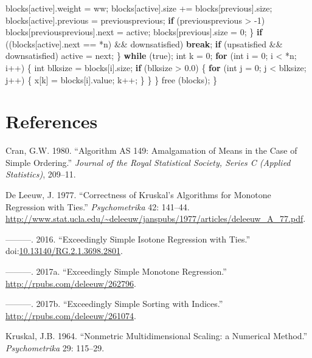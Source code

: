 \documentclass[12pt,]{article}
\newenvironment{Shaded}{\begin{snugshade}}{\end{snugshade}}
\newcommand{\KeywordTok}[1]{\textcolor[rgb]{0.13,0.29,0.53}{\textbf{{#1}}}}
\newcommand{\DataTypeTok}[1]{\textcolor[rgb]{0.13,0.29,0.53}{{#1}}}
\newcommand{\DecValTok}[1]{\textcolor[rgb]{0.00,0.00,0.81}{{#1}}}
\newcommand{\FloatTok}[1]{\textcolor[rgb]{0.00,0.00,0.81}{{#1}}}
\newcommand{\NormalTok}[1]{{#1}}
\begin{document}
\begin{Shaded}
\begin{Highlighting}[]
            \NormalTok{blocks[active].weight = ww;}
            \NormalTok{blocks[active].size += blocks[previous].size;}
            \NormalTok{blocks[active].previous = previousprevious;}
            \KeywordTok{if} \NormalTok{(previousprevious > -}\DecValTok{1}\NormalTok{)}
                \NormalTok{blocks[previousprevious].next = active;}
            \NormalTok{blocks[previous].size = }\DecValTok{0}\NormalTok{;}
        \NormalTok{\}}
        \KeywordTok{if} \NormalTok{((blocks[active].next == *n) && downsatisfied) }\KeywordTok{break}\NormalTok{;}
        \KeywordTok{if} \NormalTok{(upsatisfied && downsatisfied) active = next;}
    \NormalTok{\} }\KeywordTok{while} \NormalTok{(true);}
    \DataTypeTok{int} \NormalTok{k = }\DecValTok{0}\NormalTok{;}
    \KeywordTok{for} \NormalTok{(}\DataTypeTok{int} \NormalTok{i = }\DecValTok{0}\NormalTok{; i < *n; i++) \{}
        \DataTypeTok{int} \NormalTok{blksize = blocks[i].size;}
        \KeywordTok{if} \NormalTok{(blksize > }\FloatTok{0.0}\NormalTok{) \{}
            \KeywordTok{for} \NormalTok{(}\DataTypeTok{int} \NormalTok{j = }\DecValTok{0}\NormalTok{; j < blksize; j++) \{}
                \NormalTok{x[k] = blocks[i].value;}
                \NormalTok{k++;}
            \NormalTok{\}}
        \NormalTok{\}}
    \NormalTok{\}}
    \NormalTok{free (blocks);}
\NormalTok{\}}
\end{Highlighting}
\end{Shaded}

\section*{References}\label{references}

\hypertarget{refs}{}
\hypertarget{ref-cran_80}{}
Cran, G.W. 1980. ``Algorithm AS 149: Amalgamation of Means in the Case
of Simple Ordering.'' \emph{Journal of the Royal Statistical Society,
Series C (Applied Statistics)}, 209--11.

\hypertarget{ref-deleeuw_A_77}{}
De Leeuw, J. 1977. ``Correctness of Kruskal's Algorithms for Monotone
Regression with Ties.'' \emph{Psychometrika} 42: 141--44.
\url{http://www.stat.ucla.edu/~deleeuw/janspubs/1977/articles/deleeuw_A_77.pdf}.

\hypertarget{ref-deleeuw_E_16d}{}
---------. 2016. ``Exceedingly Simple Isotone Regression with Ties.''
doi:\href{https://doi.org/10.13140/RG.2.1.3698.2801}{10.13140/RG.2.1.3698.2801}.

\hypertarget{ref-deleeuw_E_17g}{}
---------. 2017a. ``Exceedingly Simple Monotone Regression.''
\url{http://rpubs.com/deleeuw/262796}.

\hypertarget{ref-deleeuw_E_17f}{}
---------. 2017b. ``Exceedingly Simple Sorting with Indices.''
\url{http://rpubs.com/deleeuw/261074}.

\hypertarget{ref-kruskal_64b}{}
Kruskal, J.B. 1964. ``Nonmetric Multidimensional Scaling: a Numerical
Method.'' \emph{Psychometrika} 29: 115--29.
\end{document}
